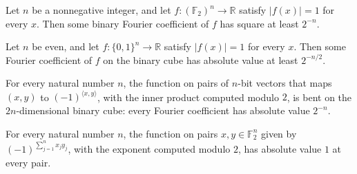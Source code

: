 \begin{theorem}
\label{FABL.exists_inv_card_le_sq_vectorFourierCoeff}
\leanok
{}
Let $n$ be a nonnegative integer, and let $f:(\mathbb{F}_2)^n\to\mathbb{R}$ satisfy
$|f(x)|=1$ for every $x$. Then some binary Fourier coefficient of $f$ has square at
least $2^{-n}$.
\end{theorem}

\begin{theorem}
\label{FABL.exists_bent_extremal_coefficient}
\leanok
{}
Let $n$ be even, and let $f:\{0,1\}^n\to\mathbb R$ satisfy $|f(x)|=1$ for every $x$.
Then some Fourier coefficient of $f$ on the binary cube has absolute value at least
$2^{-n/2}$.
\end{theorem}

\begin{theorem}
\label{FABL.isBent_innerProductModTwo}
\leanok
{}
For every natural number $n$, the function on pairs of $n$-bit vectors that maps $(x,y)$
to $(-1)^{\langle x,y\rangle}$, with the inner product computed modulo $2$, is bent on
the $2n$-dimensional binary cube: every Fourier coefficient has absolute value $2^{-n}$.
\end{theorem}

\begin{theorem}
\label{FABL.isSignValued_innerProductModTwo}
\leanok
{}
For every natural number $n$, the function on pairs $x,y\in\mathbb F_2^n$ given by
$(-1)^{\sum_{j=1}^n x_jy_j}$, with the exponent computed modulo $2$, has absolute value
$1$ at every pair.
\end{theorem}

